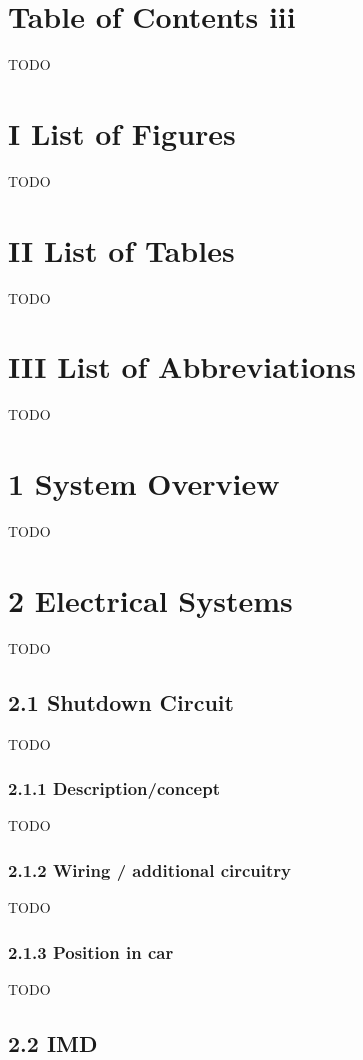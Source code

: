 \documentclass{article}
\begin{document}
\section*{Table of Contents iii}
TODO

\section*{I List of Figures}
TODO

\section*{II List of Tables}
TODO

\section*{III List of Abbreviations}
TODO

\section*{1 System Overview}
TODO

\section*{2 Electrical Systems}
TODO

\subsection*{2.1 Shutdown Circuit}
TODO

\subsubsection*{2.1.1 Description/concept}
TODO

\subsubsection*{2.1.2 Wiring / additional circuitry}
TODO

\subsubsection*{2.1.3 Position in car}
TODO

\subsection*{2.2 IMD}
\end{document}
